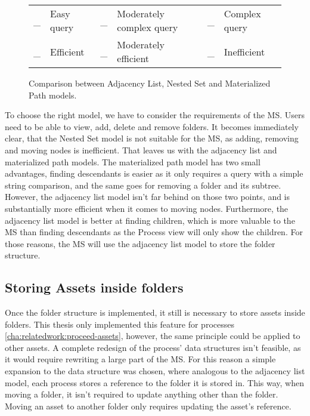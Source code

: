 \begin{figure}[H]
\vspace{.5em}

\begin{tabular}{r@{: }l r@{: }l r@{: }l}
  \goodcomplexity{\textcircled{}}\vspace{-.8em} \_ & Easy query & \mediumcomplexity{}\vspace{-.8em} \_ &
  Moderately complex query &  \badcomplexity{}\vspace{-.8em} \_ & Complex query \\

  \_ \goodefficency{\textcircled{}} & Efficient & \_ \mediumefficency{} &
  Moderately efficient &  \_ \badefficency{} & Inefficient \\
\end{tabular}


\caption{Comparison between Adjacency List, Nested Set and Materialized Path models.}
\label{fig:comparison-db-tree-models}
\end{figure}

To choose the right model, we have to consider the requirements of the MS.
Users need to be able to view, add, delete and remove folders.
It becomes immediately clear, that the Nested Set model is not suitable for the MS, as
adding, removing and moving nodes is inefficient.
That leaves us with the adjacency list and materialized path models.
The materialized path model has two small advantages, finding descendants is easier as it
only requires a query with a simple string comparison, and the same goes for removing a
folder and its subtree. 
However, the adjacency list model isn't far behind on those two points, and is
substantially more efficient when it comes to moving nodes.
Furthermore, the adjacency list model is better at finding children, which is more
valuable to the MS than finding descendants as the Process view will only show the
children.
For those reasons, the MS will use the adjacency list model to store the folder structure.

\subsection{Storing Assets inside folders}

Once the folder structure is implemented, it still is necessary to store assets inside
folders.
This thesis only implemented this feature for processes
\ref{cha:relatedwork:proceed-assets}, however, the same principle could be applied to
other assets.
A complete redesign of the process' data structures isn't feasible, as it would require
rewriting a large part of the MS.
For this reason a simple expansion to the data structure was chosen, where analogous to
the adjacency list model, each process stores a reference to the folder it is stored in.
This way, when moving a folder, it isn't required to update anything other than the
folder.
Moving an asset to another folder only requires updating the asset's reference.

